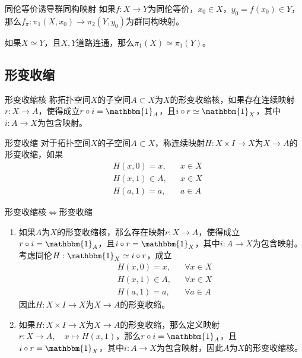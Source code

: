 \documentclass[lang = cn, scheme = chinese, thmcnt = section, usesamecnt]{elegantbook}
\newcommand{\sub}{\subset}             %
\begin{document}
\begin{theorem}{同伦等价诱导群同构映射}
	如果$f:X\to Y$为同伦等价，$x_0\in X$，$y_0=f(x_0)\in Y$，那么$f_\pi:\pi_1(X,x_0)\to\pi_2(Y,y_0)$为群同构映射。
\end{theorem}

\begin{theorem}
	如果$X\simeq Y$，且$X,Y$道路连通，那么$\pi_1(X)\simeq \pi_1(Y)$。
\end{theorem}

\subsection{形变收缩}

\begin{definition}{形变收缩核}
	称拓扑空间$X$的子空间$A\sub X$为$X$的形变收缩核，如果存在连续映射$r:X\to A$，使得成立$r\circ i=\mathbbm{1}_A$，且$i\circ r\simeq\mathbbm{1}_X$，其中$i:A\to X$为包含映射。
\end{definition}

\begin{definition}{形变收缩}
	对于拓扑空间$X$的子空间$A\sub X$，称连续映射$H:X\times  I \to X$为$X\to A$的形变收缩，如果
	\begin{align*}
		&H(x,0)=x,&&
		x\in X\\
		&H(x,1)\in A,&&
		x\in X\\
		&H(a,1)=a,&&
		a\in A
	\end{align*}
\end{definition}

\begin{theorem}{形变收缩核$\iff$形变收缩}
	\begin{enumerate}
		\item 如果$A$为$X$的形变收缩核，那么存在映射$r:X\to A$，使得成立$r\circ i=\mathbbm{1}_A$，且$i\circ r=\mathbbm{1}_X$，其中$i:A\to X$为包含映射。考虑同伦$H:\mathbbm{1}_X\simeq i\circ r$​，成立
		\begin{align*}
			&H(x,0)=x,&&\forall x\in X\\
			&H(x,1)\in A,&&\forall x\in X\\
			&H(a,1)=a,&&\forall a\in A
		\end{align*}
		因此$H:X\times  I \to X$为$X\to A$的形变收缩。
		\item 如果$H:X\times  I \to X$为$X\to A$的形变收缩，那么定义映射$r:X\to A,\quad x\mapsto H(x,1)$，那么$r\circ i=\mathbbm{1}_A$，且$i\circ r=\mathbbm{1}_X$，其中$i:A\to X$为包含映射，因此$A$为$X$的形变收缩核。
	\end{enumerate}
\end{theorem}
\end{document}
